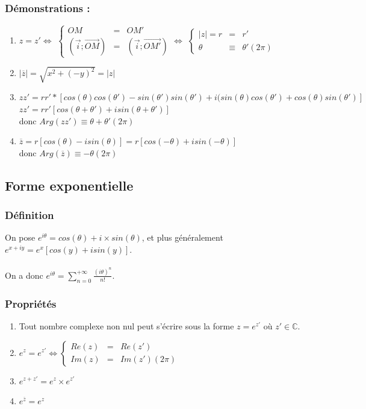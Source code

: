 \documentclass[a4paper,10pt]{book}
\newcommand{\C}{\mathbb{C}}
\begin{document}
\subsubsection{Démonstrations :}
\begin{enumerate}
\item $z=z' \Leftrightarrow$
$\left \{ \begin{array}{rcl} OM&=&OM' \\
(\vec{i};\overset{\longrightarrow}{OM})&=&(\vec{i};\overset{\longrightarrow}{OM'}) \end{array} \right .
\Leftrightarrow$
$\left \{ \begin{array}{rcl} |z|=r&=&r' \\
\theta &\equiv &\theta '(2\pi) \end{array} \right .$\\
\item $|\overline{z}|=\sqrt{x^{2}+(-y)^{2}}=|z|$\\
\item $zz'=rr'*[cos(\theta)cos(\theta ')-sin(\theta ')sin(\theta ')+i(sin(\theta)cos(\theta ')+cos(\theta)sin(\theta')]$\\
$zz'=rr'[cos(\theta +\theta ')+isin(\theta +\theta ')]$ \\
donc $Arg(zz')\equiv \theta +\theta ' (2\pi)$\\
\item $\overline{z}=r[cos(\theta)-isin(\theta)]=r[cos(-\theta)+isin(-\theta)]$\\
donc $Arg(\overline{z})\equiv -\theta (2\pi)$\\
\end{enumerate}

\subsection{Forme exponentielle}
\subsubsection{Définition}
On pose $e^{i\theta}=cos(\theta)+i\times sin(\theta)$, et plus généralement $e^{x+iy}=e^{x}[cos(y)+isin(y)]$.\\\\
On a donc $e^{i\theta}=\sum\limits_{n=0}^{+\infty} \frac{(i\theta)^{n}}{n!}$.

\subsubsection{Propriétés}
\begin{enumerate}
\item Tout nombre complexe non nul peut s'écrire sous la forme $z=e^{z'}$ où $z' \in \C$.
\item $e^{z}=e^{z'} \Leftrightarrow \left \{ \begin{array}{rcl} Re(z)&=&Re(z')\\
Im(z)&=&Im(z') (2\pi) \end{array} \right .$\\
\item $e^{z+z'}=e^{z}\times e^{z'}$
\item $e^{\overline{z}}=e^{z}$
\end{enumerate}
\end{document}
